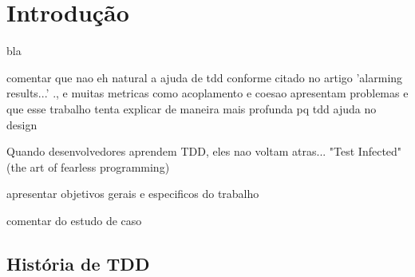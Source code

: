 \chapter{Introdução}
\label{cap:introducao}

bla

comentar que nao eh natural a ajuda de tdd conforme citado no artigo 'alarming results...' ., e muitas metricas como
acoplamento e coesao apresentam problemas
e que esse
trabalho tenta explicar de maneira mais profunda pq tdd ajuda no design

Quando desenvolvedores aprendem TDD, eles nao voltam atras... "Test Infected" (the art of fearless programming)

apresentar objetivos gerais e especificos do trabalho

comentar do estudo de caso

\section{História de TDD}